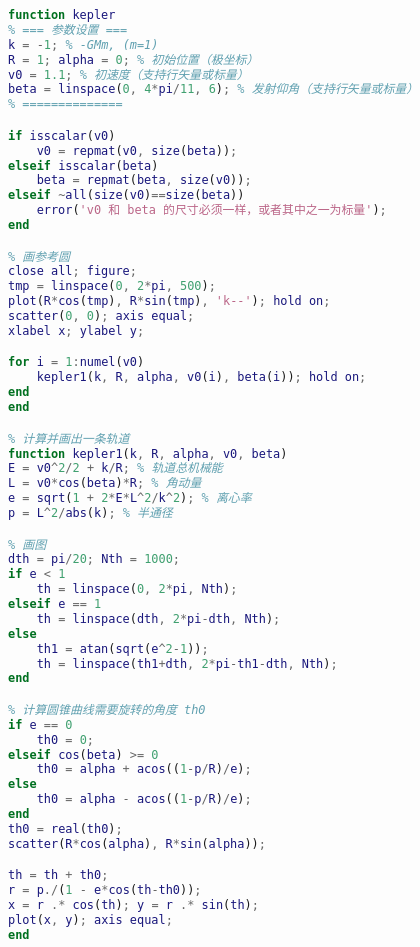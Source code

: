 \begin{lstlisting}[language=matlab]
% 已知初始位置、发射速度、发射方向， 求轨道以及运动方程
function kepler
% === 参数设置 ===
k = -1; % -GMm, (m=1)
R = 1; alpha = 0; % 初始位置（极坐标）
v0 = 1.1; % 初速度（支持行矢量或标量）
beta = linspace(0, 4*pi/11, 6); % 发射仰角（支持行矢量或标量）
% ==============

if isscalar(v0)
    v0 = repmat(v0, size(beta));
elseif isscalar(beta)
    beta = repmat(beta, size(v0));
elseif ~all(size(v0)==size(beta))
    error('v0 和 beta 的尺寸必须一样，或者其中之一为标量');
end

% 画参考圆
close all; figure;
tmp = linspace(0, 2*pi, 500);
plot(R*cos(tmp), R*sin(tmp), 'k--'); hold on;
scatter(0, 0); axis equal;
xlabel x; ylabel y;

for i = 1:numel(v0)
    kepler1(k, R, alpha, v0(i), beta(i)); hold on;
end
end

% 计算并画出一条轨道
function kepler1(k, R, alpha, v0, beta)
E = v0^2/2 + k/R; % 轨道总机械能
L = v0*cos(beta)*R; % 角动量
e = sqrt(1 + 2*E*L^2/k^2); % 离心率
p = L^2/abs(k); % 半通径

% 画图
dth = pi/20; Nth = 1000;
if e < 1
    th = linspace(0, 2*pi, Nth);
elseif e == 1
    th = linspace(dth, 2*pi-dth, Nth);
else
    th1 = atan(sqrt(e^2-1));
    th = linspace(th1+dth, 2*pi-th1-dth, Nth);
end

% 计算圆锥曲线需要旋转的角度 th0
if e == 0
    th0 = 0;
elseif cos(beta) >= 0
    th0 = alpha + acos((1-p/R)/e);
else
    th0 = alpha - acos((1-p/R)/e);
end
th0 = real(th0);
scatter(R*cos(alpha), R*sin(alpha));

th = th + th0;
r = p./(1 - e*cos(th-th0));
x = r .* cos(th); y = r .* sin(th);
plot(x, y); axis equal;
end
\end{lstlisting}
